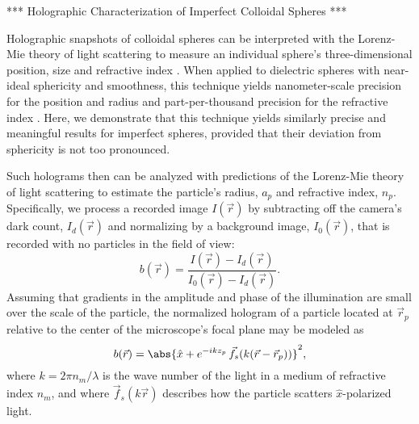 
***
Holographic Characterization of Imperfect Colloidal Spheres
***

Holographic snapshots of colloidal spheres can be interpreted
with the Lorenz-Mie theory of light scattering to measure
an individual sphere's three-dimensional position,
size and refractive index \cite{lee07a}.
When applied to dielectric spheres with near-ideal sphericity
and smoothness, this technique yields nanometer-scale
precision for the position and radius 
\cite{lee07a,cheong10a,moyses13,krishnatreya14} 
and part-per-thousand precision for the refractive index 
\cite{lee07a,shpaisman12}.
Here, we demonstrate that this technique yields similarly precise 
and meaningful results for imperfect spheres, provided that their
deviation from sphericity is not too pronounced.


Such holograms then can be analyzed 
\cite{lee07a,cheong09,cheong10a,krishnatreya14a} with predictions of the
Lorenz-Mie theory of light scattering \cite{bohren83,mishchenko02} 
to estimate the particle's radius, $a_p$ and refractive index, $n_p$.
Specifically, we process a recorded image $I(\vec{r})$ by subtracting off the
camera's dark count, $I_d(\vec{r})$ and normalizing by a background image,
$I_0(\vec{r})$,
that is recorded with no particles in the field of view:
\begin{equation}
  \label{eq:normalized}
  b(\vec{r}) 
  =
  \frac{I(\vec{r}) - I_d(\vec{r})}{I_0(\vec{r}) - I_d(\vec{r})}.
\end{equation}
Assuming that gradients in the amplitude and phase of the illumination
are small over the scale of the particle, the normalized hologram of
a particle located at $\vec{r}_p$ relative to the center of the microscope's
focal plane may be modeled as \cite{lee07a,krishnatreya14}
\begin{equation}
  \label{eq:lorenzmie}
  b(\vec{r}) 
  =
  \abs{
    \hat{x} + e^{-i k z_p} \, \vec{f}_s(k(\vec{r} - \vec{r}_p))
  }^2,
\end{equation}
where $k = 2 \pi n_m / \lambda$ is the wave number of the light in a medium
of refractive index $n_m$, and where $\vec{f}_s(k\vec{r})$ 
describes how the particle scatters $\hat{x}$-polarized light.


